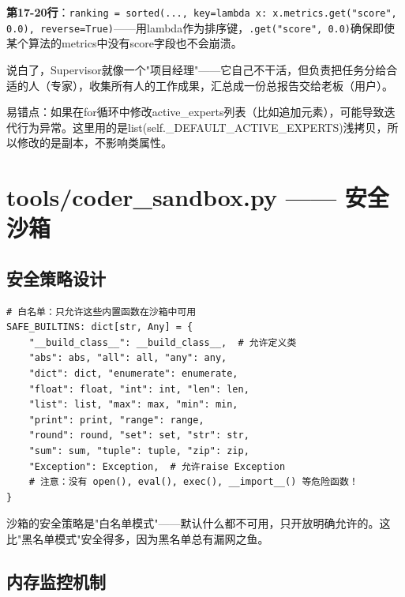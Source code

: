 \documentclass[11pt,a4paper]{ctexbook}
\begin{document}
\textbf{第17-20行}：\verb|ranking = sorted(..., key=lambda x: x.metrics.get("score", 0.0), reverse=True)|——用lambda作为排序键，\verb|.get("score", 0.0)|确保即使某个算法的metrics中没有score字段也不会崩溃。

\begin{plainbox}
    说白了，Supervisor就像一个"项目经理"——它自己不干活，但负责把任务分给合适的人（专家），收集所有人的工作成果，汇总成一份总报告交给老板（用户）。
\end{plainbox}

\begin{notebox}
    易错点：如果在for循环中修改active\_experts列表（比如追加元素），可能导致迭代行为异常。这里用的是list(self.\_DEFAULT\_ACTIVE\_EXPERTS)浅拷贝，所以修改的是副本，不影响类属性。
\end{notebox}

\section{tools/coder\_sandbox.py —— 安全沙箱}

\subsection{安全策略设计}

\begin{verbatim}
# 白名单：只允许这些内置函数在沙箱中可用
SAFE_BUILTINS: dict[str, Any] = {
    "__build_class__": __build_class__,  # 允许定义类
    "abs": abs, "all": all, "any": any,
    "dict": dict, "enumerate": enumerate,
    "float": float, "int": int, "len": len,
    "list": list, "max": max, "min": min,
    "print": print, "range": range,
    "round": round, "set": set, "str": str,
    "sum": sum, "tuple": tuple, "zip": zip,
    "Exception": Exception,  # 允许raise Exception
    # 注意：没有 open(), eval(), exec(), __import__() 等危险函数！
}
\end{verbatim}

\begin{plainbox}
    沙箱的安全策略是"白名单模式"——默认什么都不可用，只开放明确允许的。这比"黑名单模式"安全得多，因为黑名单总有漏网之鱼。
\end{plainbox}

\subsection{内存监控机制}
\end{document}
